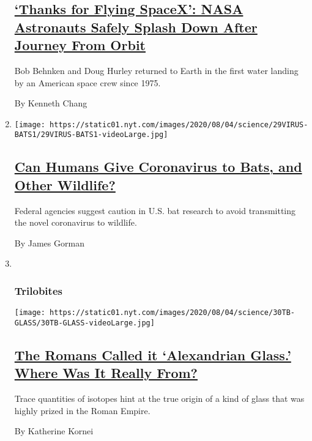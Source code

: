 \begin{enumerate}
  \hypertarget{thanks-for-flying-spacex-nasa-astronauts-safely-splash-down-after-journey-from-orbit}{%
  \subsection{\texorpdfstring{\href{/2020/08/02/science/spacex-astronauts-splashdown.html}{`Thanks
  for Flying SpaceX': NASA Astronauts Safely Splash Down After Journey
  From
  Orbit}}{`Thanks for Flying SpaceX': NASA Astronauts Safely Splash Down After Journey From Orbit}}\label{thanks-for-flying-spacex-nasa-astronauts-safely-splash-down-after-journey-from-orbit}}

  Bob Behnken and Doug Hurley returned to Earth in the first water
  landing by an American space crew since 1975.

  By Kenneth Chang
\item
  \texttt{[image: https://static01.nyt.com/images/2020/08/04/science/29VIRUS-BATS1/29VIRUS-BATS1-videoLarge.jpg]}

  \hypertarget{can-humans-give-coronavirus-to-bats-and-other-wildlife}{%
  \subsection{\texorpdfstring{\href{/2020/08/01/science/Covid-bats.html}{Can
  Humans Give Coronavirus to Bats, and Other
  Wildlife?}}{Can Humans Give Coronavirus to Bats, and Other Wildlife?}}\label{can-humans-give-coronavirus-to-bats-and-other-wildlife}}

  Federal agencies suggest caution in U.S. bat research to avoid
  transmitting the novel coronavirus to wildlife.

  By James Gorman
\item ~
  \hypertarget{trilobites-3}{%
  \subsubsection{Trilobites}\label{trilobites-3}}

  \texttt{[image: https://static01.nyt.com/images/2020/08/04/science/30TB-GLASS/30TB-GLASS-videoLarge.jpg]}

  \hypertarget{the-romans-called-it-alexandrian-glass-where-was-it-really-from}{%
  \subsection{\texorpdfstring{\href{/2020/07/31/science/alexandrian-glass-rome.html}{The
  Romans Called it `Alexandrian Glass.' Where Was It Really
  From?}}{The Romans Called it `Alexandrian Glass.' Where Was It Really From?}}\label{the-romans-called-it-alexandrian-glass-where-was-it-really-from}}

  Trace quantities of isotopes hint at the true origin of a kind of
  glass that was highly prized in the Roman Empire.

  By Katherine Kornei
\end{enumerate}

